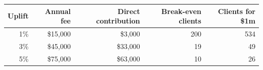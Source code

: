 \begin{tabular}{rrrrr}
\toprule
Uplift & Annual fee & Direct contribution & Break-even clients & Clients for \$1m \\
\midrule
1\% & \$15,000 & \$3,000 & 200 & 534 \\
3\% & \$45,000 & \$33,000 & 19 & 49 \\
5\% & \$75,000 & \$63,000 & 10 & 26 \\
\bottomrule
\end{tabular}

